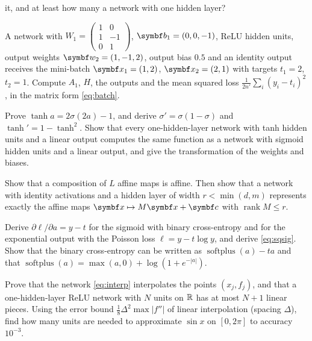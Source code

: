\documentclass[11pt]{article}
\newcommand{\w}{\vect{w}}
\newcommand{\vb}{\vect{b}}
\newcommand{\softplus}{\operatorname{softplus}}
\begin{document}
\begin{questions}
\begin{calculations}
  it, and at least how many a network with one hidden layer?
\item A network with $W_1 = \begin{pmatrix} 1 & 0 \\ 1 & -1 \\ 0 & 1 \end{pmatrix}$, $\vb_1 = (0, 0, -1)$, ReLU hidden
  units, output weights $\w_2 = (1, -1, 2)$, output bias $0.5$ and an identity output receives the mini-batch
  $\x_1 = (1, 2)$, $\x_2 = (2, 1)$ with targets $t_1 = 2$, $t_2 = 1$. Compute $A_1$, $H$, the outputs and the mean
  squared loss $\frac{1}{2n'}\sum_i (y_i - t_i)^2$, in the matrix form \eqref{eq:batch}.
\end{calculations}

\begin{derivations}
\item Prove $\tanh a = 2\sigma(2a) - 1$, and derive $\sigma' = \sigma(1 - \sigma)$ and $\tanh' = 1 - \tanh^2$. Show that
  every one-hidden-layer network with tanh hidden units and a linear output computes the same function as a network
  with sigmoid hidden units and a linear output, and give the transformation of the weights and biases.
\item Show that a composition of $L$ affine maps is affine. Then show that a network with identity activations and a
  hidden layer of width $r < \min(d, m)$ represents exactly the affine maps $\x \mapsto M\x + \vect{c}$ with
  $\operatorname{rank} M \le r$.
\item Derive $\partial \ell/\partial a = y - t$ for the sigmoid with binary cross-entropy and for the exponential output
  with the Poisson loss $\ell = y - t\log y$, and derive \eqref{eq:sqsig}. Show that the binary cross-entropy can be written
  as $\softplus(a) - ta$ and that $\softplus(a) = \max(a, 0) + \log(1 + e^{-|a|})$.
\item Prove that the network \eqref{eq:interp} interpolates the points $(x_j, f_j)$, and that a one-hidden-layer ReLU
  network with $N$ units on $\mathbb{R}$ has at most $N + 1$ linear pieces. Using the error bound $\frac18 \Delta^2\max|f''|$ of
  linear interpolation (spacing $\Delta$), find how many units are needed to approximate $\sin x$ on $[0, 2\pi]$ to accuracy $10^{-3}$.
\end{derivations}


\end{questions}
\end{document}
